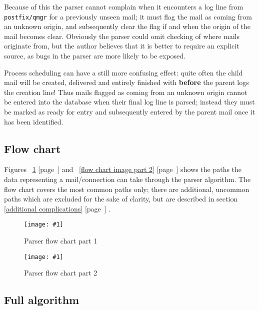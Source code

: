 \documentclass[a4paper,12pt,draft]{article}
\newcommand{\showgraph}[3]{
    \begin{figure}[hbt!]
        \caption{#2}\label{#3}
        \texttt{[image: \#1]}
    \end{figure}
}
\newcommand{\refwithpage}[1]{%
    \empty{}\ref{#1} [page~\pageref{#1}]%
}
\newcommand{\daemon}[1]{%
    \texttt{postfix/#1}%
}
\begin{document}
Because of this the parser cannot complain when it encounters a log line
from \daemon{qmgr} for a previously unseen mail; it must flag the mail as
coming from an unknown origin, and subsequently clear the flag if and when
the origin of the mail becomes clear.  Obviously the parser could omit
checking of where mails originate from, but the author believes that it is
better to require an explicit source, as bugs in the parser are more likely
to be exposed.

Process scheduling can have a still more confusing effect: quite often the
child mail will be created, delivered and entirely finished with
\textbf{before} the parent logs the creation line!  Thus mails flagged as
coming from an unknown origin cannot be entered into the database when
their final log line is parsed; instead they must be marked as ready for
entry and subsequently entered by the parent mail once it has been
identified.

\subsection{Flow chart}

\label{flow-chart}

Figures~\refwithpage{flow chart image part 1} and~\refwithpage{flow chart
image part 2} shows the paths the data representing a mail/connection can
take through the parser algorithm.  The flow chart covers the most common
paths only; there are additional, uncommon paths which are excluded for the
sake of clarity, but are described in section~\refwithpage{additional
complications}.


\showgraph{build/logparser-flow-chart-part-1}{Parser flow chart part
1}{flow chart image part 1}

\showgraph{build/logparser-flow-chart-part-2}{Parser flow chart part
2}{flow chart image part 2}

\clearpage

\subsection{Full algorithm}
\end{document}
